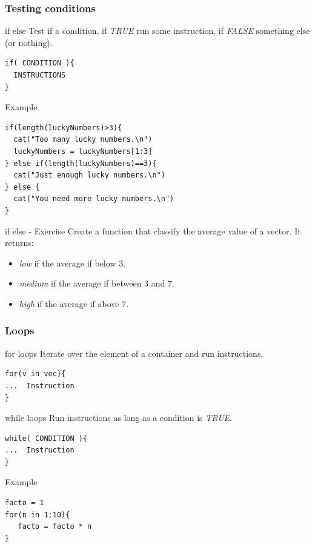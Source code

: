 \documentclass[10pt]{beamer}
\newenvironment{xframe}[2][]
  {\begin{frame}[fragile,environment=xframe,#1]
  \frametitle{#2}}
  {\end{frame}}
\begin{document}


\begin{xframe}{Testing conditions}
  \begin{block}{{\sf if else}}
    Test if a condition, if {\it TRUE} run some instruction, if {\it FALSE} something else (or nothing).
\begin{verbatim}
if( CONDITION ){
  INSTRUCTIONS
} 
\end{verbatim}  
  \end{block}
  \begin{exampleblock}{Example}
\begin{verbatim}
if(length(luckyNumbers)>3){
  cat("Too many lucky numbers.\n")
  luckyNumbers = luckyNumbers[1:3]
} else if(length(luckyNumbers)==3){
  cat("Just enough lucky numbers.\n")
} else {
  cat("You need more lucky numbers.\n")
}
\end{verbatim}  
  \end{exampleblock}
\end{xframe}


\begin{frame}{{\sf if else} - Exercise}
  Create a function that classify the average value of a vector. It returns:
  \begin{itemize}
  \item {\it low} if the average if below $3$.
  \item {\it medium} if the average if between $3$ and $7$.
  \item {\it high} if the average if above $7$.
  \end{itemize}
\end{frame}



\begin{xframe}{Loops}
  \begin{block}{{\sf for} loops}
    Iterate over the element of a container and run instructions.
\begin{verbatim}
for(v in vec){
...  Instruction
}
\end{verbatim}  
  \end{block}
  \begin{block}{{\sf while} loops}
    Run instructions as long as a condition is {\it TRUE}.
\begin{verbatim}
while( CONDITION ){
...  Instruction
}
\end{verbatim}  
  \end{block}
  \begin{exampleblock}{Example}
\begin{verbatim}
facto = 1
for(n in 1:10){
   facto = facto * n
}
\end{verbatim}  
  \end{exampleblock}
\end{xframe}
\end{document}
